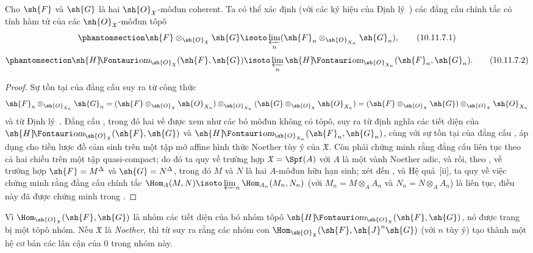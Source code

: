 \documentclass[oneside]{amsart}
\makeatletter
\newcommand*{\ega@sheafop}[3]{\sh{#1}#2\textup{\kern-2.2pt{\Fontauri\slshape #3}}}
\newcommand*{\shHom}{\ega@sheafop{H}{}{om}}
\let\EGAOriginalLabel\label
\renewcommand{\label}[1]{\phantomsection\EGAOriginalLabel{#1}}
\makeatother
\begin{document}
\begin{proposition}[10.11.7]
\label{I.10.11.7}
Cho $\sh{F}$ và $\sh{G}$ là hai $\sh{O}_\mathfrak{X}$-môđun coherent.
Ta có thể xác định (với các ký hiệu của Định lý~) các đẳng cấu chính tắc có tính hàm tử của các $\sh{O}_\mathfrak{X}$-môđun tôpô 
\[
\label{I.10.11.7.1}
  \sh{F}\otimes_{\sh{O}_\mathfrak{X}}\sh{G}\isoto\varprojlim_n(\sh{F}_n\otimes_{\sh{O}_{X_n}}\sh{G}_n),
  \tag{10.11.7.1}
\]
\[
\label{I.10.11.7.2}
  \shHom_{\sh{O}_\mathfrak{X}}(\sh{F},\sh{G})\isoto\varprojlim_n\shHom_{\sh{O}_{X_n}}(\sh{F}_n,\sh{G}_n).
  \tag{10.11.7.2}
\]
\end{proposition}

\begin{proof}
Sự tồn tại của đẳng cấu  suy ra từ công thức
\[
  \sh{F}_n\otimes_{\sh{O}_{X_n}}\sh{G}_n=(\sh{F}\otimes_{\sh{O}_\mathfrak{X}}\sh{O}_{X_n})\otimes_{\sh{O}_{X_n}}(\sh{G}\otimes_{\sh{O}_\mathfrak{X}}\sh{O}_{X_n})=(\sh{F}\otimes_{\sh{O}_\mathfrak{X}}\sh{G})\otimes_{\sh{O}_\mathfrak{X}}\sh{O}_{X_n}
\]
và từ Định lý~.
Đẳng cấu , trong đó hai vế được xem như các bó môđun không có tôpô, suy ra từ định nghĩa các tiết diện của $\shHom_{\sh{O}_\mathfrak{X}}(\sh{F},\sh{G})$ và $\shHom_{\sh{O}_{X_n}}(\sh{F}_n,\sh{G}_n)$, cùng với sự tồn tại của đẳng cấu , áp dụng cho tiền lược đồ cảm sinh trên một tập mở affine hình thức Noether tùy ý của $\mathfrak{X}$.
Còn phải chứng minh rằng đẳng cấu  liên tục theo cả hai chiều trên một tập quasi-compact; do đó ta quy về trường hợp $\mathfrak{X}=\Spf(A)$ với $A$ là một vành Noether adic, và rồi, theo , về trường hợp $\sh{F}=M^\Delta$ và $\sh{G}=N^\Delta$, trong đó $M$ và $N$ là hai $A$-môđun hữu hạn sinh; xét đến ,  và Hệ quả~[ii], ta quy về việc chứng minh rằng đẳng cấu chính tắc $\Hom_A(M,N)\isoto\varprojlim_n\Hom_{A_n}(M_n,N_n)$ (với $M_n=M\otimes_A A_n$ và $N_n=N\otimes_A A_n$) là liên tục, điều này đã được chứng minh trong .
\end{proof}

\begin{env}[10.11.8]
\label{I.10.11.8}
Vì $\Hom_{\sh{O}_\mathfrak{X}}(\sh{F},\sh{G})$ là nhóm các tiết diện của bó nhóm tôpô $\shHom_{\sh{O}_\mathfrak{X}}(\sh{F},\sh{G})$, nó được trang bị một tôpô nhóm.
Nếu $\mathfrak{X}$ là \emph{Noether}, thì từ  suy ra rằng các nhóm con $\Hom_{\sh{O}_\mathfrak{X}}(\sh{F},\sh{J}^n\sh{G})$ (với $n$ tùy ý) tạo thành một hệ cơ bản các lân cận của $0$ trong nhóm này.
\end{env}
\end{document}
